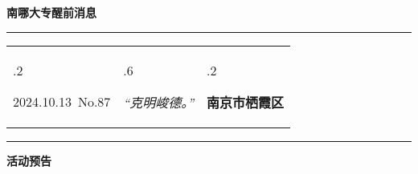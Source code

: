 \documentclass[letterpaper, 12pt]{article}
\begin{document}
\begin{center}
    \Huge\textbf{南哪大专醒前消息}
\end{center}
\vspace{4mm}
\hrule
\renewcommand\tabularxcolumn[1]{m{#1}}
\begin{tabularx}{\textwidth}{>{\hsize.2\hsize}X>{\hsize.6\hsize}X>{\hsize.2\hsize}X}
    \begin{flushleft}
        2024.10.13\, No.87
    \end{flushleft}
    &
    \begin{center}
        \textit{“克明峻德。”}
    \end{center}
    &
    \begin{flushright}
        \textbf{南京市栖霞区}
    \end{flushright}
\end{tabularx}
\vspace{-3.5mm}
\hrule
\vspace{4mm}
\centerline{\huge\textbf{活动预告}}
\end{document}
